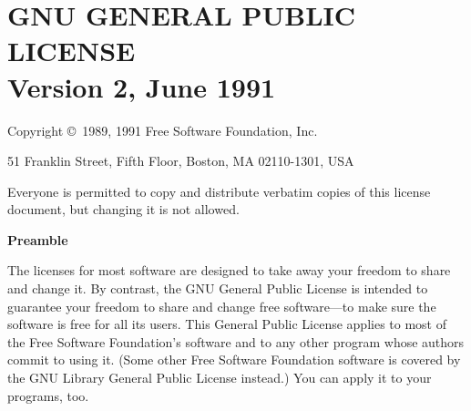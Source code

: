 %
%
%
%
%

\chapter[GNU General Public License, version 2]{GNU GENERAL PUBLIC LICENSE\\
{\Large Version 2, June 1991}} \label{gplfull}

\begin{center}
  {\parindent 0in

    Copyright \copyright\ 1989, 1991 Free Software Foundation, Inc.

    \bigskip

    51 Franklin Street, Fifth Floor, Boston, MA  02110-1301, USA

    \bigskip

    Everyone is permitted to copy and distribute verbatim copies
    of this license document, but changing it is not allowed.
  }
\end{center}

\begin{center}
  {\bf\large Preamble}
\end{center}

The licenses for most software are designed to take away your freedom to
share and change it.  By contrast, the GNU General Public License is
intended to guarantee your freedom to share and change free software---to
make sure the software is free for all its users.  This General Public
License applies to most of the Free Software Foundation's software and to
any other program whose authors commit to using it.  (Some other Free
Software Foundation software is covered by the GNU Library General Public
License instead.)  You can apply it to your programs, too.


